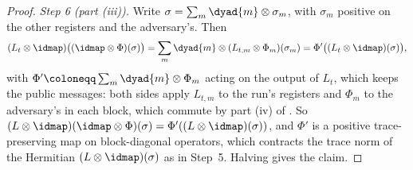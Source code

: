 \begin{proof}
\emph{Step 6 (part (iii)).} Write $\sigma=\sum_m\dyad{m}\otimes\sigma_m$, with
$\sigma_m$ positive on the other registers and the adversary's. Then
\begin{equation*}
  (L_t\otimes\idmap)\big((\idmap\otimes\Phi)(\sigma)\big)
  =\sum_m\dyad{m}\otimes(L_{t,m}\otimes\Phi_m)(\sigma_m)
  =\Phi'\big((L_t\otimes\idmap)(\sigma)\big),
\end{equation*}
with $\Phi'\coloneqq\sum_m\dyad{m}\otimes\Phi_m$ acting on the output of
$L_t$, which keeps the public messages: both sides apply $L_{t,m}$ to the run's
registers and $\Phi_m$ to the adversary's in each block, which commute by
part (iv) of . So
$(L\otimes\idmap)(\idmap\otimes\Phi)(\sigma)=\Phi'((L\otimes\idmap)(\sigma))$,
and $\Phi'$ is a positive trace-preserving map on block-diagonal operators,
which contracts the trace norm of the Hermitian $(L\otimes\idmap)(\sigma)$ as
in Step~5. Halving gives the claim.
\end{proof}
